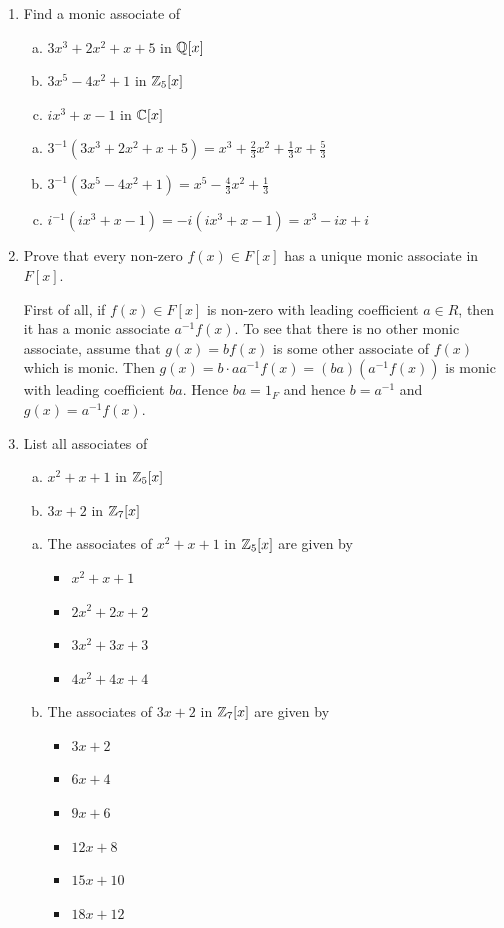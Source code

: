 \documentclass[11pt,fleqn,dvipsnames,usenames]{article}
\begin{document}
\begin{enumerate}
\item Find a monic associate of
\begin{enumerate}[(a)]
\item $3x^3 + 2x^2 + x + 5$ in $\mathbb{Q}[x]$
\item $3x^5 - 4x^2 + 1$ in $\mathbb{Z}_{5}[x]$
\item $ix^3 + x - 1$ in $\mathbb{C}[x]$
\end{enumerate}
\vsmsp

\solution
\begin{enumerate}[(a)]
\item $3^{-1}(3x^3 + 2x^2 + x + 5) = x^3 + \frac{2}{3}x^2 + \frac{1}{3}x + \frac{5}{3}$
\item $3^{-1}(3x^5 - 4x^2 + 1) = x^5 - \frac{4}{3}x^2 + \frac{1}{3}$
\item $i^{-1}(ix^3 + x - 1) = -i(ix^3 + x - 1) = x^3 -ix + i$
\end{enumerate}

\item Prove that every non-zero $f(x)\in F[x]$ has a unique monic associate in $F[x]$.
\vsmsp

\solution First of all, if $f(x)\in F[x]$ is non-zero with leading coefficient $a\in R$, then it has a monic associate $a^{-1}f(x)$.  To see that there is no other monic associate, assume that $g(x) = bf(x)$ is some other associate of $f(x)$ which is monic.  Then $g(x) = b\cdot a a^{-1}f(x) = (ba)(a^{-1}f(x))$ is monic with leading coefficient $ba$.  Hence $ba = 1_{F}$ and hence $b = a^{-1}$ and $g(x) = a^{-1}f(x)$.

\item List all associates of
\begin{enumerate}[(a)]
\item $x^2 + x + 1$ in $\mathbb{Z}_{5}[x]$
\item $3x + 2$ in $\mathbb{Z}_{7}[x]$
\end{enumerate}
\vsmsp

\solution
\begin{enumerate}[(a)]
\item The associates of $x^2 + x + 1$ in $\mathbb{Z}_{5}[x]$ are given by
\begin{itemize}
\item $x^2 + x + 1$
\item $2x^2 + 2x + 2$
\item $3x^2 + 3x + 3$
\item $4x^2 + 4x + 4$
\end{itemize}
\item The associates of $3x + 2$ in $\mathbb{Z}_{7}[x]$ are given by
\begin{itemize}
\item $3x + 2$
\item $6x + 4$
\item $9x + 6$
\item $12x + 8$
\item $15x + 10$
\item $18x + 12$
\end{itemize}
\end{enumerate}


\end{enumerate}
\end{document}

